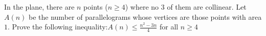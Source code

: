 In the plane, there are $n$ points ($n\ge 4$) where no 3 of them are collinear. Let $A(n)$ be the number of parallelograms whose vertices are those points with area $1$. Prove the following inequality:$A(n)\leq \frac{n^2-3n}{4}$ for all $n\ge 4$